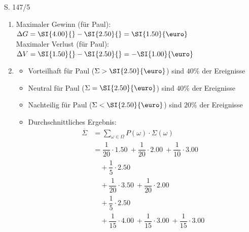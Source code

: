 \begin{Exercise}{S. 147/5}{}
\begin{enumerate}
\begin{enumerate}[label=\alph*),leftmargin=*]
{\begin{minipage}[t]{0.45\linewidth}
\begin{align*}
                E_{2} &= \begin{array}[t]{l}
                        \{ (F; F; Z); \ (F; Z); \ (F; E; Z);\\
                        (Z; F); \ (Z; Z); \ (Z; E); \\
                        (E; Z); \\
                        (E; F; Z); \ (E; F; F)
                    \} \end{array}&&\\
                \end{align*}
            \end{minipage}
            }
        \item[d)] {
            Maximaler Gewinn (für Paul): \quad $\Delta G = \SI{4.00}{} - \SI{2.50}{} = \SI{1.50}{\text{\euro}}$\\[1.0ex]
            Maximaler Verlust (für Paul): \quad $\Delta V = \SI{1.50}{} - \SI{2.50}{} = -\SI{1.00}{\text{\euro}}$\\[-1.0ex]
            }
        \item[e)] {
            \begin{itemize}[leftmargin=*]
                \item Vorteilhaft für Paul ($\Sigma > \SI{2.50}{\text{\euro}}$) sind $40 \%$ der Ereignisse
                \item Neutral für Paul ($\Sigma = \SI{2.50}{\text{\euro}}$) sind $40 \%$ der Ereignisse
                \item Nachteilig für Paul ($\Sigma < \SI{2.50}{\text{\euro}}$) sind $20 \%$ der Ereignisse
                \item Durchschnittliches Ergebnis:
                    \begin{align*}
                        \overline{\Sigma} &= \sum_{\omega \in \Omega} P(\omega) \cdot \Sigma(\omega) \\
                        &= \dfrac{1}{20} \cdot \SI{1.50}{} + \dfrac{1}{20} \cdot \SI{2.00}{} + \dfrac{1}{10} \cdot \SI{3.00}{} \\[1.5ex]
                        &\quad + \dfrac{1}{5} \cdot \SI{2.50}{}\\[1.5ex]
                        &\quad + \dfrac{1}{20} \cdot \SI{3.50}{} + \dfrac{1}{20} \cdot \SI{2.00}{} \\[1.5ex]
                        &\quad + \dfrac{1}{5} \cdot \SI{2.50}{}\\[1.5ex]
                        &\quad + \dfrac{1}{15} \cdot \SI{4.00}{} + \dfrac{1}{15} \cdot \SI{3.00}{} + \dfrac{1}{15} \cdot \SI{3.00}{} \\[1.5ex]

\end{align*}
\end{itemize}}
\end{enumerate}
\end{enumerate}
\end{Exercise}
